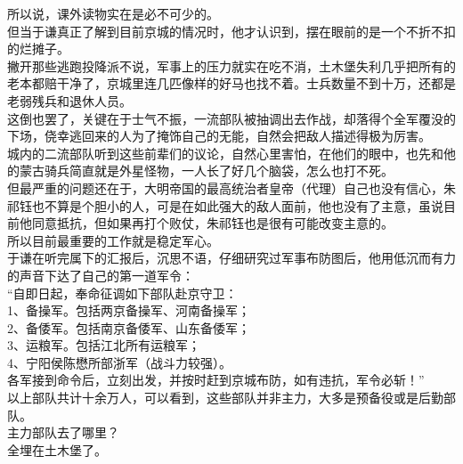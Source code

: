 \begin{multicols}{\theparacolNo}
所以说，课外读物实在是必不可少的。\\

但当于谦真正了解到目前京城的情况时，他才认识到，摆在眼前的是一个不折不扣的烂摊子。\\

撇开那些逃跑投降派不说，军事上的压力就实在吃不消，土木堡失利几乎把所有的老本都赔干净了，京城里连几匹像样的好马也找不着。士兵数量不到十万，还都是老弱残兵和退休人员。\\

这倒也罢了，关键在于士气不振，一流部队被抽调出去作战，却落得个全军覆没的下场，侥幸逃回来的人为了掩饰自己的无能，自然会把敌人描述得极为厉害。\\

城内的二流部队听到这些前辈们的议论，自然心里害怕，在他们的眼中，也先和他的蒙古骑兵简直就是外星怪物，一人长了好几个脑袋，怎么也打不死。\\

但最严重的问题还在于，大明帝国的最高统治者皇帝（代理）自己也没有信心，朱祁钰也不算是个胆小的人，可是在如此强大的敌人面前，他也没有了主意，虽说目前他同意抵抗，但如果再打个败仗，朱祁钰也是很有可能改变主意的。\\

所以目前最重要的工作就是稳定军心。\\

于谦在听完属下的汇报后，沉思不语，仔细研究过军事布防图后，他用低沉而有力的声音下达了自己的第一道军令：\\

“自即日起，奉命征调如下部队赴京守卫：\\

1、备操军。包括两京备操军、河南备操军；\\

2、备倭军。包括南京备倭军、山东备倭军；\\

3、运粮军。包括江北所有运粮军；\\

4、宁阳侯陈懋所部浙军（战斗力较强）。\\

各军接到命令后，立刻出发，并按时赶到京城布防，如有违抗，军令必斩！”\\

以上部队共计十余万人，可以看到，这些部队并非主力，大多是预备役或是后勤部队。\\

主力部队去了哪里？\\

全埋在土木堡了。\\


\end{multicols}

